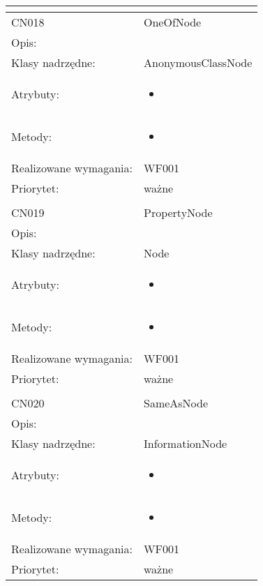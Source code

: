\documentclass[a4paper,10pt]{article}
\begin{document}
\begin{center}
\begin{longtable}{|m{3cm}|m{9cm}|}
\multicolumn{2}{c}{} \\
 \hline

CN018 & OneOfNode \\ \hline
Opis: &     \\ \hline
Klasy nadrzędne: & AnonymousClassNode     \\ \hline
Atrybuty: & \begin{itemize}
 \item 
\end{itemize}
 \\ \hline
Metody: & \begin{itemize}
 \item 
\end{itemize}
  \\ \hline
Realizowane wymagania: & WF001 \\ \hline
Priorytet: & ważne  \\ \hline

\multicolumn{2}{c}{} \\
 \hline

CN019 & PropertyNode \\ \hline
Opis: &     \\ \hline
Klasy nadrzędne: & Node     \\ \hline
Atrybuty: & \begin{itemize}
 \item 
\end{itemize}
 \\ \hline
Metody: & \begin{itemize}
 \item 
\end{itemize}
  \\ \hline
Realizowane wymagania: & WF001 \\ \hline
Priorytet: & ważne  \\ \hline

\multicolumn{2}{c}{} \\
 \hline

CN020 & SameAsNode \\ \hline
Opis: &     \\ \hline
Klasy nadrzędne: & InformationNode     \\ \hline
Atrybuty: & \begin{itemize}
 \item 
\end{itemize}
 \\ \hline
Metody: & \begin{itemize}
 \item 
\end{itemize}
  \\ \hline
Realizowane wymagania: & WF001 \\ \hline
Priorytet: & ważne  \\ \hline


\end{longtable}
\end{center}
\end{document}
